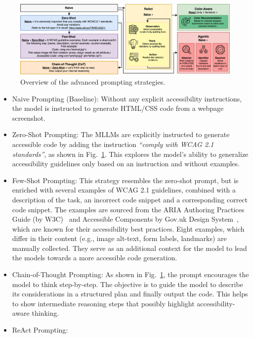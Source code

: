 \begin{figure}
  \centering
  \includegraphics[width=0.85\linewidth]{figures/prompts_new_new.png}
  \caption{Overview of the advanced prompting strategies.}
  \label{fig:prompts_new} 
\end{figure}


\begin{itemize}
    \item Naive Prompting (Baseline): Without any explicit accessibility instructions, the model is
    instructed to generate HTML/CSS code from a webpage screenshot.
    \item Zero-Shot Prompting: The MLLMs are explicitly instructed to 
    generate accessible code by adding the instruction \textit{``comply with WCAG 2.1 standards''}, 
    as shown in Fig.~\ref{fig:prompts_new}. 
    This explores the model's ability to generalize accessibility guidelines 
    only based on an instruction and without examples.
    \item Few-Shot Prompting: This strategy resembles the zero-shot prompt,
    but is enriched with several examples of WCAG 2.1 guidelines, combined 
    with a description of the task, an incorrect code snippet and a 
    corresponding correct code snippet.
    The examples are sourced from the ARIA Authoring Practices Guide 
    (by W3C)~\cite{web:w3c_examples} and Accessible Components by Gov.uk 
    Design System~\cite{web:govuk}, which are known for their accessibility
    best practices.
    Eight examples, which differ in their content (e.g., image alt-text, 
    form labels, landmarks) are manually collected. They serve as an 
    additional context for the model to lead the models towards a more 
    accessible code generation.
    \item Chain-of-Thought Prompting: As shown in Fig.~\ref{fig:prompts_new}, 
    the prompt encourages the model to think step-by-step. 
    The objective is to guide the model to describe its 
    considerations in a structured plan and finally output the code.
    This helps to show intermediate reasoning steps that possibly 
    highlight accessibility-aware thinking.
    \item ReAct Prompting: 

\end{itemize}
